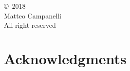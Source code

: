 

\cleardoublepage

\null\vfill
\noindent
\begin{center}
\copyright \ 2018 \\ Matteo Campanelli\\
All right reserved
\end{center}
\newpage

\begin{abstractpage}

\end{abstractpage}

% 

\cleardoublepage


\myreaderpage

\cleardoublepage

\section*{Acknowledgments}

